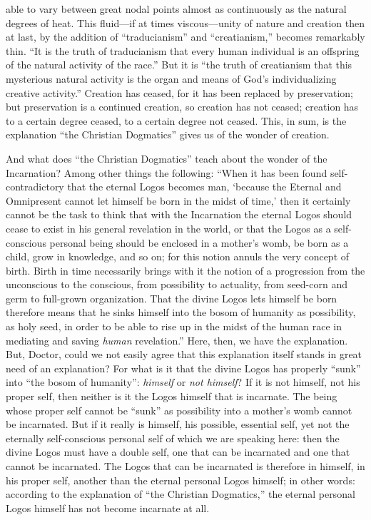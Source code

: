 \documentclass[12pt,a4paper]{article}
\newcommand{\opage}[1]{\marginnote{\footnotesize\textit{[#1]}}}
\begin{document}
able to vary between great nodal points almost as continuously as
the natural degrees of heat. This fluid---if at times viscous---unity
of nature and creation then at last, by the addition of
``traducianism'' and ``creatianism,'' becomes remarkably thin. ``It
is the truth of traducianism that every human individual is an
offspring of the natural activity of the race.'' But it is ``the
truth of creatianism that this mysterious natural activity is the
organ and means of God's
\opage{8}%
individualizing creative activity.'' Creation has ceased, for it has
been replaced by preservation; but preservation is a continued
creation, so creation has not ceased; creation has to a certain
degree ceased, to a certain degree not ceased. This, in sum, is the
explanation ``the Christian Dogmatics'' gives us of the wonder of
creation.

And what does ``the Christian Dogmatics'' teach about the wonder of
the Incarnation? Among other things the following: ``When it has
been found self-contradictory that the eternal Logos becomes man,
`because the Eternal and Omnipresent cannot let himself be born in
the midst of time,' then it certainly cannot be the task to think
that with the Incarnation the eternal Logos should cease to exist in
his general revelation in the world, or that the Logos as a
self-conscious personal being should be enclosed in a mother's womb,
be born as a child, grow in knowledge, and so on; for this notion
annuls the very concept of birth. Birth in time necessarily brings
with it the notion of a progression from the unconscious to the
conscious, from possibility to actuality, from seed-corn and germ to
full-grown organization. That the divine Logos lets himself be born
therefore means that he sinks himself into the bosom of humanity as
possibility, as holy seed, in order to be able to rise up in the
midst of the human race in mediating and saving
\emph{human} revelation.'' Here, then, we have the explanation. But,
Doctor, could we not easily agree that this explanation itself
stands in great need of an explanation? For what is it that the
divine Logos has properly ``sunk'' into ``the bosom of humanity'':
\emph{himself} or \emph{not himself}? If it is not himself, not his
proper self, then neither is it the Logos himself that is
incarnate. The being whose proper self cannot be ``sunk'' as
possibility into a mother's womb cannot be incarnated. But if it
really is himself, his possible, essential self, yet not the
eternally self-conscious personal self of which we are speaking
here: then the divine Logos must have a double self, one that can be
incarnated and one that cannot be incarnated. The Logos that can be
incarnated is therefore in himself, in his proper self, another than
the eternal personal Logos
\opage{9}%
himself; in other words: according to the explanation of ``the
Christian Dogmatics,'' the eternal personal Logos himself has not
become incarnate at all.
\end{document}
